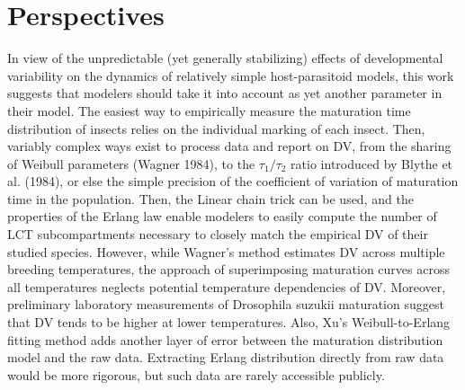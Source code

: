\documentclass[12pt,a4paper,onecolumn]{article}
\begin{document}
\section{Perspectives}
\tabto{1 cm} In view of the unpredictable (yet generally stabilizing) effects of developmental variability on the dynamics of relatively simple host-parasitoid models, this work suggests that modelers should take it into account as yet another parameter in their model. The easiest way to empirically measure the maturation time distribution of insects relies on the individual marking of each insect. Then, variably complex ways exist to process data and report on DV, from the sharing of Weibull parameters (Wagner 1984), to the $\tau_1/\tau_2$ ratio introduced by Blythe et al. (1984), or else the simple precision of the coefficient of variation of maturation time in the population. Then, the Linear chain trick can be used, and the properties of the Erlang law enable modelers to easily compute the number of LCT subcompartments necessary to closely match the empirical DV of their studied species. However, while Wagner’s method estimates DV across multiple breeding temperatures, the approach of superimposing maturation curves across all temperatures neglects potential temperature dependencies of DV. Moreover, preliminary laboratory measurements of Drosophila suzukii maturation suggest that DV tends to be higher at lower temperatures. Also, Xu's Weibull-to-Erlang fitting method adds another layer of error between the maturation distribution model and the raw data. Extracting Erlang distribution directly from raw data would be more rigorous, but such data are rarely accessible publicly. 
\end{document}
